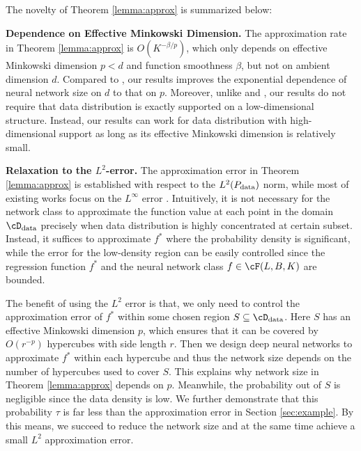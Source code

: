 The novelty of Theorem \ref{lemma:approx} is summarized below:

\textbf{Dependence on Effective Minkowski Dimension.} The approximation rate in Theorem \ref{lemma:approx} is $O(K^{-\beta/p})$, which only depends on effective Minkowski dimension $p < d$ and function smoothness $\beta$, but not on ambient dimension $d$. Compared to \citet{YAROTSKY2017103}, our results improves the exponential dependence of neural network size on $d$ to that on $p$. Moreover, unlike \citet{nakada2020adaptive} and \citet{chen2022nonparametric}, our results do not require that data distribution is exactly supported on a low-dimensional structure. Instead, our results can work for data distribution with high-dimensional support as long as its effective Minkowski dimension is relatively small.

\textbf{Relaxation to the $L^2$-error.} The approximation error in Theorem \ref{lemma:approx} is established with respect to the $L^2(P_{\rm data})$ norm, while most of existing works focus on the $L^\infty$ error \citep{YAROTSKY2017103,nakada2020adaptive,chen2019efficient}. Intuitively, it is not necessary for the network class to approximate the function value at each point in the domain $\cD_{\rm data}$ precisely when data distribution is highly concentrated at certain subset. Instead, it suffices to approximate $f^*$ where the probability density is significant, while the error for the low-density region can be easily controlled since the regression function $f^*$ and the neural network class $f \in \cF(L,B,K)$ are bounded.

The benefit of using the $L^2$ error is that, we only need to control the approximation error of $f^*$ within some chosen region $S\subseteq \cD_{\rm data}$. Here $S$ has an effective Minkowski dimension $p$, which ensures that it can be covered by $O(r^{-p})$ hypercubes with side length $r$. Then we design deep neural networks to approximate $f^*$ within each hypercube and thus the network size depends on the number of hypercubes used to cover $S$. This explains why network size in Theorem \ref{lemma:approx} depends on $p$. Meanwhile, the probability out of $S$ is negligible since the data density is low. We further demonstrate that this probability $\tau$ is far less than the approximation error in Section \ref{sec:example}. By this means, we succeed to reduce the network size and at the same time achieve a small $L^2$ approximation error. 

